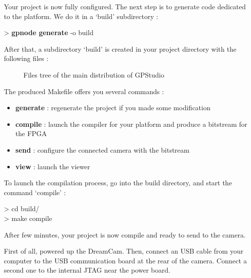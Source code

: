 \documentclass[10pt,a4paper]{article}
\begin{document}
Your project is now fully configured. The next step is to generate code dedicated to the platform. We do it in a `build' subdirectory :

\begin{sample}
> \textbf{gpnode generate} -o build
\end{sample}

After that, a subdirectory `build' is created in your project directory with the following files :

\begin{figure}[h]
\caption{Files tree of the main distribution of GPStudio}
\label{fig:archivetree}
\end{figure}

The produced Makefile offers you several commands :
\begin{itemize}
\item \textbf{generate} : regenerate the project if you made some modification
\item \textbf{compile} : launch the compiler for your platform and produce a bitstream for the FPGA
\item \textbf{send} : configure the connected camera with the bitstream
\item \textbf{view} : launch the viewer
\end{itemize}

To launch the compilation process, go into the build directory, and start the command `compile' :

\begin{sample}
> cd build/\\
> make compile
\end{sample}

After few minutes, your project is now compile and ready to send to the camera.

First of all, powered up the DreamCam. Then, connect an USB cable from your computer to the USB communication board at the rear of the camera. Connect a second one to the internal JTAG near the power board.
\end{document}

